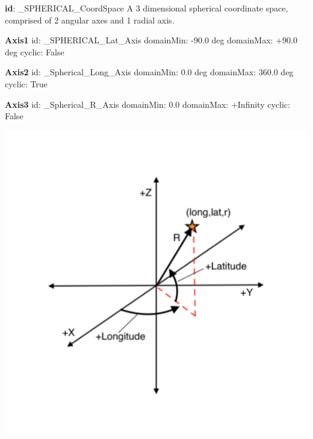   \begin{minipage}{0.5\textwidth}
    \small
    \textbf{id}: \_SPHERICAL\_CoordSpace \newline
    A 3 dimensional spherical coordinate space, comprised of 2 angular axes and 1 radial axis.
    
    \noindent \textbf{Axis1} \newline
    \indent id:  \_SPHERICAL\_Lat\_Axis \newline
    \indent domainMin:  -90.0 deg \newline
    \indent domainMax:  +90.0 deg \newline
    \indent cyclic: False \newline
    
    \noindent \textbf{Axis2} \newline
    \indent id:  \_Spherical\_Long\_Axis \newline
    \indent domainMin: 0.0 deg \newline
    \indent domainMax: 360.0 deg \newline
    \indent cyclic: True \newline
    
    \noindent \textbf{Axis3} \newline
    \indent id:  \_Spherical\_R\_Axis \newline
    \indent domainMin: 0.0 \newline
    \indent domainMax: +Infinity \newline
    \indent cyclic:  False \newline
    \normalsize
  \end{minipage}
  \begin{minipage}{0.5\textwidth}
    \includegraphics{diagrams/SphericalSpace.png}
  \end{minipage}

